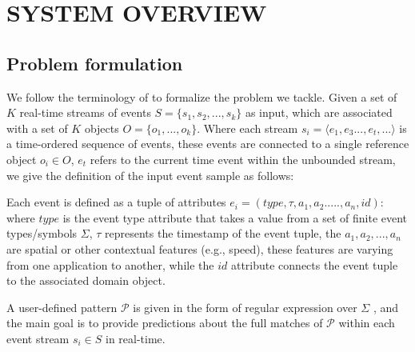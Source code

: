 \section{SYSTEM OVERVIEW}
\subsection{Problem formulation}

We follow the terminology of \cite{luckham2008power,alevizos2015complex,zhou2015pattern} to formalize the problem we tackle. Given a set of $K$ real-time streams of events $S = \{ s_1,s_2, ..., s_k\}$ as input, which are associated with a set of $K$  objects $O = \{ o_1, ..., o_k\}$. Where each stream $s_i=\langle e_1,e_3...,e_t,...\rangle$  is a time-ordered sequence of events, these events are connected to a single reference object $o_i \in O$,  $e_t$  refers to the current time event within the unbounded stream, we give the definition of the input event sample as follows:  
\begin{definition}
	Each event is defined as a tuple of attributes $e_i = (type,\tau,a_1,a_2.....,a_n,id)$:  where $type$ is the event type attribute that takes a value from a set of finite event types/symbols $\Sigma$, $\tau$ represents the timestamp of the event tuple,  the  $a_1,a_2,...,a_n$ are spatial or other contextual features (e.g., speed), these features are varying from one application to another, while the $id$ attribute connects the event tuple to the associated domain object.
\end{definition}

A user-defined pattern $\mathcal{P}$ is given in the form of regular expression over $\Sigma$ \cite{alevizos2017event}, and the main goal is to provide predictions about the full matches of $\mathcal{P}$ within each event stream $s_i\in S$ in real-time.

